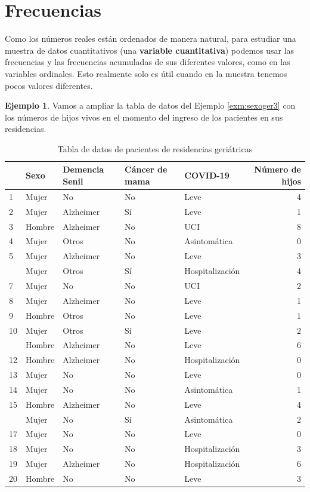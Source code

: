 \documentclass[
]{book}
\theoremstyle{definition}
\theoremstyle{definition}
\newtheorem{example}{Ejemplo}[chapter]
\theoremstyle{definition}
\theoremstyle{definition}
\theoremstyle{remark}
\begin{document}
\hypertarget{frecuencias}{%
\section{Frecuencias}\label{frecuencias}}

Como los números reales están ordenados de manera natural, para estudiar una muestra de datos cuantitativos (una \textbf{variable cuantitativa}) podemos usar las frecuencias y las frecuencias acumuladas de sus diferentes valores, como en las variables ordinales. Esto realmente solo es útil cuando en la muestra tenemos pocos valores diferentes.

\begin{example}
\protect\hypertarget{exm:sexoger4}{}\label{exm:sexoger4}Vamos a ampliar la tabla de datos del Ejemplo \ref{exm:sexoger3} con los números de hijos vivos en el momento del ingreso de los pacientes en sus residencias.
\end{example}

\begin{table}

\caption{\label{tab:tablager4}Tabla de datos de pacientes de residencias geriátricas}
\centering
\begin{tabular}[t]{lllllr}
\toprule
  & Sexo & Demencia Senil & Cáncer de mama & COVID-19 & Número de hijos\\
\midrule
1 & Mujer & No & No & Leve & 4\\
2 & Mujer & Alzheimer & Sí & Leve & 1\\
3 & Hombre & Alzheimer & No & UCI & 8\\
4 & Mujer & Otros & No & Asintomática & 0\\
5 & Mujer & Alzheimer & No & Leve & 3\\
\addlinespace
6 & Mujer & Otros & Sí & Hospitalización & 4\\
7 & Mujer & No & No & UCI & 2\\
8 & Mujer & Alzheimer & No & Leve & 1\\
9 & Hombre & Otros & No & Leve & 1\\
10 & Mujer & Otros & Sí & Leve & 2\\
\addlinespace
11 & Hombre & Alzheimer & No & Leve & 6\\
12 & Hombre & Alzheimer & No & Hospitalización & 0\\
13 & Mujer & No & No & Leve & 0\\
14 & Mujer & No & No & Asintomática & 1\\
15 & Hombre & Alzheimer & No & Leve & 4\\
\addlinespace
16 & Mujer & No & Sí & Asintomática & 2\\
17 & Mujer & No & No & Leve & 0\\
18 & Mujer & No & No & Hospitalización & 3\\
19 & Mujer & Alzheimer & No & Hospitalización & 6\\
20 & Hombre & No & No & Leve & 3\\
\bottomrule
\end{tabular}
\end{table}
\end{document}
